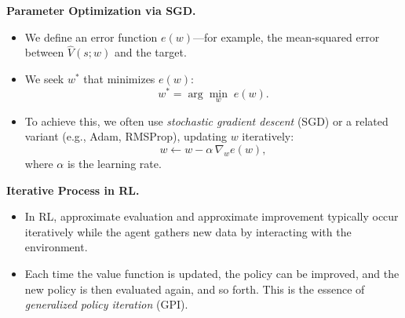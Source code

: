 \noindent
\textbf{Parameter Optimization via SGD.}
\begin{itemize}
    \item We define an error function $e(w)$—for example, the mean-squared error 
    between $\hat{V}(s; w)$ and the target.
    \item We seek $w^*$ that minimizes $e(w)$:
    \[
    w^* 
    = \arg\min_{w} \; e(w).
    \]
    \item To achieve this, we often use \emph{stochastic gradient descent} (SGD) 
    or a related variant (e.g., Adam, RMSProp), updating $w$ iteratively:
    \[
    w \leftarrow w - \alpha \,\nabla_w e(w),
    \]
    where $\alpha$ is the learning rate.
\end{itemize}

\noindent
\textbf{Iterative Process in RL.}
\begin{itemize}
    \item In RL, approximate evaluation and approximate improvement typically 
    occur iteratively while the agent gathers new data by interacting with the environment.
    \item Each time the value function is updated, the policy can be improved, 
    and the new policy is then evaluated again, and so forth. This is the essence 
    of \emph{generalized policy iteration} (GPI).
\end{itemize}
